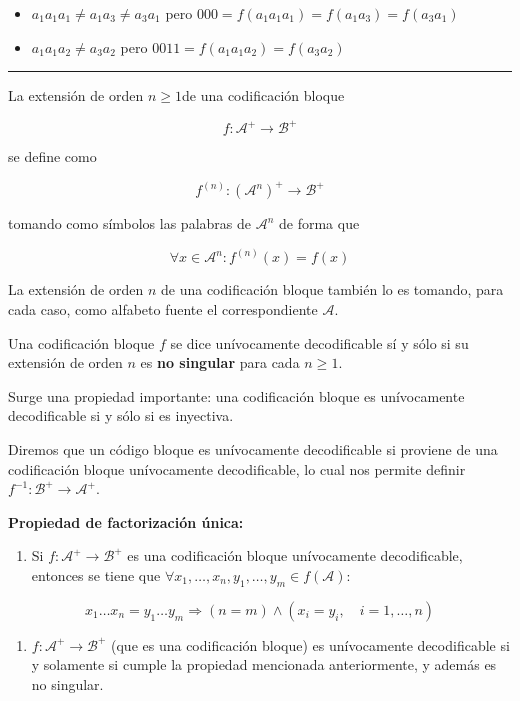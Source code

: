 \begin{itemize}
\tightlist
\item
  \(a_1a_1a_1\neq a_1a_3\neq a_3a_1\) pero
  \(000 = f(a_1a_1a_1 ) = f(a_1a_3) = f(a_3a_1)\)
\item
  \(a_1a_1a_2\neq a_3a_2\) pero \(0011 = f(a_1a_1a_2) = f(a_3a_2)\)
\end{itemize}

\begin{center}\rule{0.5\linewidth}{0.5pt}\end{center}

La extensión de orden \(n\geq 1\)de una codificación bloque

\[
f:\mathcal{A}^+\rightarrow\mathcal{B}^+
\]

se define como

\[
f^{(n)}:\left(\mathcal{A}^n\right)^+\rightarrow\mathcal{B}^+
\]

tomando como símbolos las palabras de \(\mathcal{A}^n\) de forma que

\[
\forall x\in\mathcal{A}^n: f^{(n)}(x)=f(x)
\]

La extensión de orden \(n\) de una codificación bloque también lo es
tomando, para cada caso, como alfabeto fuente el correspondiente
\(\mathcal{A}\).

Una codificación bloque \(f\) se dice unívocamente decodificable sí y
sólo si su extensión de orden \(n\) es \textbf{no singular} para cada
\(n\geq 1\).

Surge una propiedad importante: una codificación bloque es unívocamente
decodificable si y sólo si es inyectiva.

Diremos que un código bloque es unívocamente decodificable si proviene
de una codificación bloque unívocamente decodificable, lo cual nos
permite definir \(f^{-1}:\mathcal{B}^+\rightarrow\mathcal{A}^+\).

\textbf{Propiedad de factorización única:}

\begin{enumerate}
\def\labelenumi{\arabic{enumi}.}
\tightlist
\item
  Si \(f:\mathcal{A}^+\rightarrow\mathcal{B}^+\) es una codificación
  bloque unívocamente decodificable, entonces se tiene que
  \(\forall x_1,\dots,x_n,y_1,\dots,y_m\in f(\mathcal{A})\):
\end{enumerate}

\[
x_1\dots x_n=y_1\dots y_m \Rightarrow (n = m)\wedge\left(x_i=y_i,\quad i = 1,\dots,n\right)
\]

\begin{enumerate}
\def\labelenumi{\arabic{enumi}.}
\setcounter{enumi}{1}
\tightlist
\item
  \(f:\mathcal{A}^+\rightarrow\mathcal{B}^+\) (que es una codificación
  bloque) es unívocamente decodificable si y solamente si cumple la
  propiedad mencionada anteriormente, y además es no singular.
\end{enumerate}

